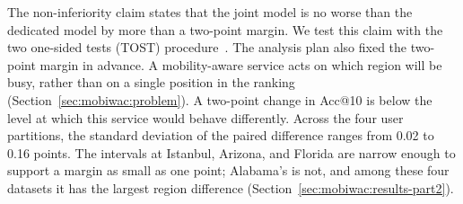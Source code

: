 The non-inferiority claim states that the joint model is no worse than the dedicated model by more than a two-point margin. We test this claim with the two one-sided tests (TOST) procedure~\cite{lakens2017tost}. The analysis plan also fixed the two-point margin in advance. A mobility-aware service acts on which region will be busy, rather than on a single position in the ranking (Section~\ref{sec:mobiwac:problem}). A two-point change in Acc@10 is below the level at which this service would behave differently. Across the four user partitions, the standard deviation of the paired difference ranges from 0.02 to 0.16 points. The intervals at Istanbul, Arizona, and Florida are narrow enough to support a margin as small as one point; Alabama's is not, and among these four datasets it has the largest region difference (Section~\ref{sec:mobiwac:results-part2}).
